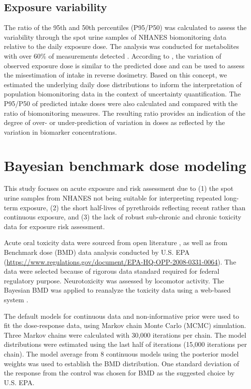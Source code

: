 \documentclass[toxics,article,submit,pdftex,moreauthors]{Definitions/mdpi}
\begin{document}
\subsection{Exposure variability}\label{exposure-variability}

The ratio of the 95th and 50th percentiles (P95/P50) was calculated to
assess the variability through the spot urine samples of NHANES
biomonitoring data relative to the daily exposure dose. The analysis was
conducted for metabolites with over 60\% of measurements detected
\citep{faure_evaluation_2020}. According to
\citet{aylward_interpreting_2012}, the variation of observed exposure
dose is similar to the predicted dose and can be used to assess the
misestimation of intake in reverse dosimetry. Based on this concept, we
estimated the underlying daily dose distributions to inform the
interpretation of population biomonitoring data in the context of
uncertainty quantification. The P95/P50 of predicted intake doses were
also calculated and compared with the ratio of biomonitoring measures.
The resulting ratio provides an indication of the degree of over- or
under-prediction of variation in doses as reflected by the variation in
biomarker concentrations.

\section{Bayesian benchmark dose
modeling}\label{bayesian-benchmark-dose-modeling}

This study focuses on acute exposure and risk assessment due to (1) the
spot urine samples from NHANES not being suitable for interpreting
repeated long-term exposure, (2) the short half-lives of pyrethroids
reflecting recent rather than continuous exposure, and (3) the lack of
robust sub-chronic and chronic toxicity data for exposure risk
assessment.

Acute oral toxicity data were sourced from open literature
\citep{wolansky_relative_2006}, as well as from Benchmark dose (BMD)
data analysis conducted by U.S. EPA
(\url{https://www.regulations.gov/document/EPA-HQ-OPP-2008-0331-0064}).
The data were selected because of rigorous data standard required for
federal regulatory purpose. Neurotoxicity was assessed by locomotor
activity. The Bayesian BMD was applied to reanalyze the toxicity data
using a web-based system \citep{shao_kan_web_2018}.

The default models for continuous data and non-informative prior were
used to fit the dose-response data, using Markov chain Monte Carlo
(MCMC) simulation. Three Markov chains were calculated with 30,000
iterations per chain. The model distributions were estimated using the
last half of iterations (15,000 iterations per chain). The model average
from 8 continuous models using the posterior model weights was used to
establish the BMD distribution. One standard deviation of the response
from the control was chosen for BMD as the suggested choice by U.S. EPA.
\end{document}
